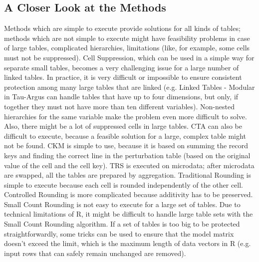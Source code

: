 \subsection{A Closer Look at the Methods}
Methods which are simple to execute provide solutions for all kinds of tables; methods which are not simple to execute might have feasibility problems in case of large tables, complicated hierarchies, limitations (like, for example, some cells must not be suppressed).
Cell Suppression, which can be used in a simple way for separate small tables, becomes a very challenging issue for a large number of linked tables. In practice, it is very difficult or impossible to ensure consistent protection among many large tables that are linked (e.g. Linked Tables - Modular in Tau-Argus can handle tables that have up to four dimensions, but only, if together they must not have more than ten different variables). Non-nested hierarchies for the same variable make the problem even more difficult to solve. Also, there might be a lot of suppressed cells in large tables.
CTA can also be difficult to execute, because a feasible solution for a large, complex table might not be found.
CKM is simple to use, because it is based on summing the record keys and finding the correct line in the perturbation table (based on the original value of the cell and the cell key).
TRS is executed on microdata; after microdata are swapped, all the tables are prepared by aggregation.
Traditional Rounding is simple to execute because each cell is rounded independently of the other cell. Controlled Rounding is more complicated because additivity has to be preserved.
Small Count Rounding is not easy to execute for a large set of tables. Due to technical limitations of R, it might be difficult to handle large table sets with the Small Count Rounding algorithm. If a set of tables is too big to be protected straightforwardly, some tricks can be used to ensure that the model matrix doesn't exceed the limit, which is the maximum length of data vectors in R (e.g. input rows that can safely remain unchanged are removed).

